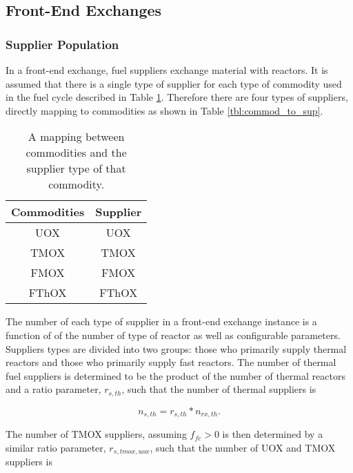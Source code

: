 \subsection{Front-End Exchanges}\label{method:setup:front}

\subsubsection{Supplier Population}

In a front-end exchange, fuel suppliers exchange material with reactors. It is
assumed that there is a single type of supplier for each type of commodity used
in the fuel cycle described in Table \ref{tbl:fc_to_commods}. Therefore there
are four types of suppliers, directly mapping to commodities as shown in Table
\ref{tbl:commod_to_sup}.

\begin{table}[h]
\centering
\caption{A mapping between commodities and the supplier type of that commodity.}
\label{tbl:fc_to_commods}
\begin{tabular}{|c|c|}
\hline
Commodities            & Supplier \\ \hline
UOX                    & UOX         \\ \hline
TMOX                    & TMOX         \\ \hline
FMOX                    & FMOX         \\ \hline
FThOX                    & FThOX         \\ \hline
\end{tabular}
\end{table}

The number of each type of supplier in a front-end exchange instance is a
function of of the number of type of reactor as well as configurable
parameters. Suppliers types are divided into two groups: those who primarily
supply thermal reactors and those who primarily supply fast reactors. The number
of thermal fuel suppliers is determined to be the product of the number of
thermal reactors and a ratio parameter, $r_{s, th}$, such that the number of
thermal suppliers is

\begin{equation}
n_{s, th} = r_{s, th} * n_{rx, th}.
\end{equation}

The number of TMOX suppliers, assuming $f_{fc} > 0$ is then determined by a
similar ratio parameter, $r_{s, tmox, uox}$, such that the number of UOX and
TMOX suppliers is

